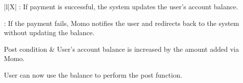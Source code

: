 \documentclass[../Main.tex]{subfiles}
\begin{document}
\begin{enumerate}
\begin{table}[H]
\begin{tblr}{|l|X|}
                  : If payment is successful, the system updates the user's account balance.

                  : If the payment fails, Momo notifies the user and redirects back to the system without updating the balance. \\ \hline

                  Post condition &
                  User's account balance is increased by the amount added via Momo.

                  User can now use the balance to perform the post function.
                  \\ \hline
              \end{tblr}
          \end{table}
\end{enumerate}
\end{document}
